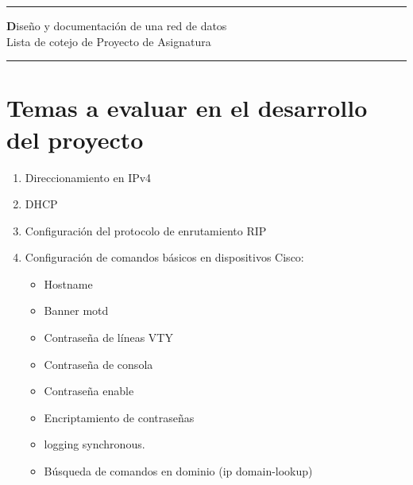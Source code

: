 \documentclass[12pt]{article}
\begin{document}

\begin{center}
\noindent\rule{\textwidth}{1pt}
{\huge\textbf Diseño y documentación de una red de datos}\\
\vspace{10px}
Lista de cotejo de Proyecto de Asignatura
\noindent\rule{\textwidth}{1pt}
\end{center}

\section{Temas a evaluar en el desarrollo del proyecto}
\begin{enumerate}
\item Direccionamiento en IPv4
\item DHCP
\item Configuración del protocolo de enrutamiento RIP
\item Configuración de comandos básicos en dispositivos Cisco:
	\begin{itemize}
    	\item Hostname
    	\item Banner motd
        \item Contraseña de líneas VTY
        \item Contraseña de consola
        \item Contraseña enable
        \item Encriptamiento de contraseñas
	        \item logging synchronous.
        \item Búsqueda de comandos en dominio (ip domain-lookup)
    \end{itemize}
\end{enumerate}
\end{document}
